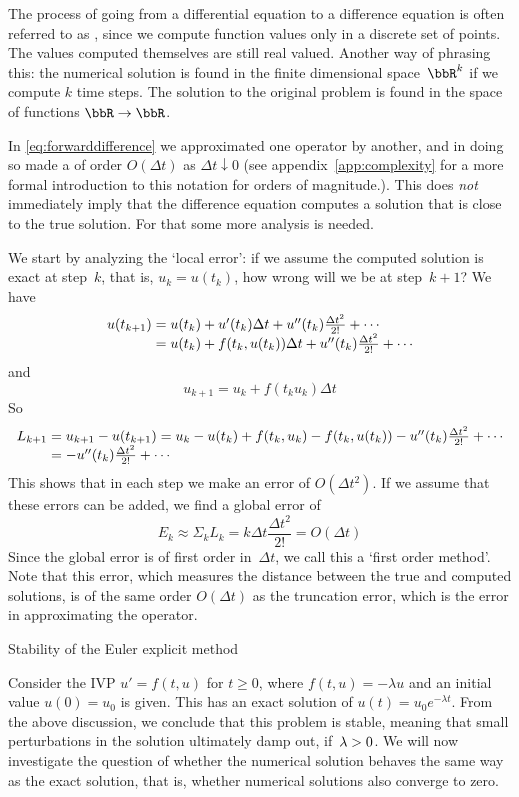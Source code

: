 The process of going from a differential equation to a difference
equation is often referred to as , since we
compute function values only in a discrete set of points. The values
computed themselves are still real valued. Another way of phrasing
this: the numerical solution is found in the finite dimensional
space~$\bbR^k$ if we compute $k$ time steps. The solution to the original
problem is found in the space of functions $\bbR\rightarrow\bbR$.

In \eqref{eq:forwarddifference} we approximated one operator by
another, and in doing so made a  of order
$O(\Delta t)$ as $\Delta t\downarrow 0$ (see
appendix~\ref{app:complexity} for a more formal introduction to this
notation for orders of magnitude.). This does \emph{not} immediately
imply that the difference equation computes a solution that is close
to the true solution. For that some more analysis is needed.

We start by analyzing the `local error': if we assume the computed
solution is exact at step~$k$, that is, $u_k=u(t_k)$, how wrong will
we be at step~$k+1$? We have
\[
  \begin{array}{r@{{}={}}l}
    u(t_{k+1})&u(t_k)+u'(t_k)\Delta t+u''(t_k)\frac{\Delta t^2}{2!}+\cdots\\
    &u(t_k)+f(t_k,u(t_k))\Delta t+u''(t_k)\frac{\Delta
      t^2}{2!}+\cdots\\
  \end{array}
\]
and
\[
    u_{k+1}=u_k+f(t_ku_k)\Delta t    
\]
  So 
\[
  \begin{array}{r@{{}={}}l}
  L_{k+1}&u_{k+1}-u(t_{k+1})=u_k-u(t_k)+f(t_k,u_k)-f(t_k,u(t_k))
  -u''(t_k)\frac{\Delta t^2}{2!}+\cdots\\
  &-u''(t_k)\frac{\Delta t^2}{2!}+\cdots
  \end{array}
\]
This shows that in each step we make an error of $O(\Delta t^2)$. If
we assume that these errors can be added, we find a global error of
\[ E_k\approx\Sigma_k L_k=k\Delta t\frac{\Delta t^2}{2!}  =O(\Delta t)
\] 
%
Since the global error is of first order in~$\Delta t$, we call
this a `first order method'. Note that this error, which measures the
distance between the true and computed solutions, is of the same order
$O(\Delta t)$
as the truncation error, which is the error in approximating the
operator.

 {Stability of the  Euler explicit method}

Consider the \ac{IVP} $u'=f(t,u)$ for $t\geq0$, 
where $f(t,u)=-\lambda u$ and an initial value $u(0)=u_0$ is given.
This has an exact solution
of $u(t)=u_0e^{-\lambda t}$. From the above discussion, we conclude
that this problem is stable, meaning that small perturbations in the
solution ultimately damp out, if~$\lambda>\nobreak0$. We will now
investigate the question of whether the numerical solution behaves the
same way as the exact solution, that is, 
whether numerical solutions also converge
to zero.

